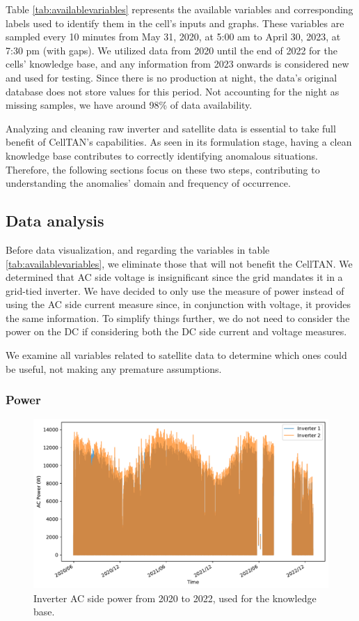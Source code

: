 Table \ref{tab:availablevariables} represents the available variables and corresponding labels used to identify them in the cell's inputs and graphs. These variables are sampled every 10 minutes from May 31, 2020, at 5:00 am to April 30, 2023, at 7:30 pm (with gaps). We utilized data from 2020 until the end of 2022 for the cells' knowledge base, and any information from 2023 onwards is considered new and used for testing. Since there is no production at night, the data's original database does not store values for this period. Not accounting for the night as missing samples, we have around 98\% of data availability.

Analyzing and cleaning raw inverter and satellite data is essential to take full benefit of CellTAN's capabilities. As seen in its formulation stage, having a clean knowledge base contributes to correctly identifying anomalous situations. Therefore, the following sections focus on these two steps, contributing to understanding the anomalies' domain and frequency of occurrence.

\subsection{Data analysis}

Before data visualization, and regarding the variables in table \ref{tab:availablevariables}, we eliminate those that will not benefit the CellTAN. We determined that AC side voltage is insignificant since the grid mandates it in a grid-tied inverter. We have decided to only use the measure of power instead of using the AC side current measure since, in conjunction with voltage, it provides the same information. To simplify things further, we do not need to consider the power on the DC if considering both the DC side current and voltage measures.

We examine all variables related to satellite data to determine which ones could be useful, not making any premature assumptions.

\subsubsection{Power}


\begin{figure}[h!]
    \centering
    \includegraphics[width=\textwidth]{figures/chapter5/analysis/00_power_kb.pdf}
    \caption{Inverter AC side power from 2020 to 2022, used for the knowledge base.}
    \label{fig:eda_power_kb}
\end{figure}

